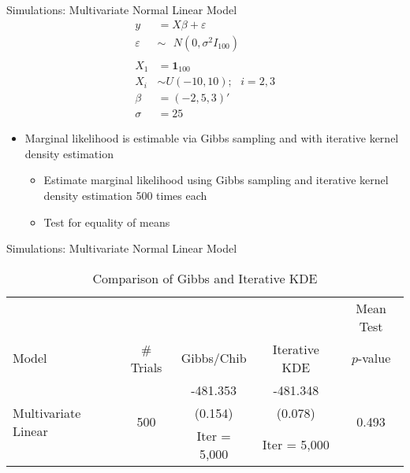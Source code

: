 \documentclass{beamer}
\newcommand{\ep}{\varepsilon}
\begin{document}
\begin{frame}{Simulations: Multivariate Normal Linear Model}
\begin{subequations}
	\begin{align}
	y &= X\beta + \ep \\
	\ep &\sim \mbox{ }N(0, \sigma^2 I_{100})\\
	\mbox{\ } \\
	X_1 &= \mathbf{1}_{100}\\
	X_i &\sim U(-10, 10); \mbox{\ \ \ \ } i = 2, 3\\
	\beta &= (-2, 5, 3)'\\
	\sigma &= 25
	\end{align}
\end{subequations}

\begin{itemize}
	\item Marginal likelihood is estimable via Gibbs sampling and with iterative kernel density estimation
		\begin{itemize}
			\item Estimate marginal likelihood using Gibbs sampling and iterative kernel density estimation 500 times each
			\item Test for equality of means
		\end{itemize}
\end{itemize}
\end{frame}

\begin{frame}{Simulations: Multivariate Normal Linear Model}
\begin{table}
	\footnotesize
	\centering
	\begin{tabular}{l|c|c|c|c}
		&  &  &  & Mean Test \\ 
		Model & \# Trials & Gibbs/Chib & Iterative KDE & $p$-value \\ 
		\hline
		\hline
		\multirow{3}{*}{Multivariate Linear} & \multirow{3}{*}{500} & -481.353 & -481.348 & \multirow{3}{*}{0.493} \\ 
		&  & (0.154) & (0.078) &  \\ 
		&  & Iter = 5,000 & Iter = 5,000 &  \\ 
		\hline
	\end{tabular}
	\caption{Comparison of Gibbs and Iterative KDE} 
	\label{tab:MVN-Probit}
\end{table}
\end{frame}
\end{document}
